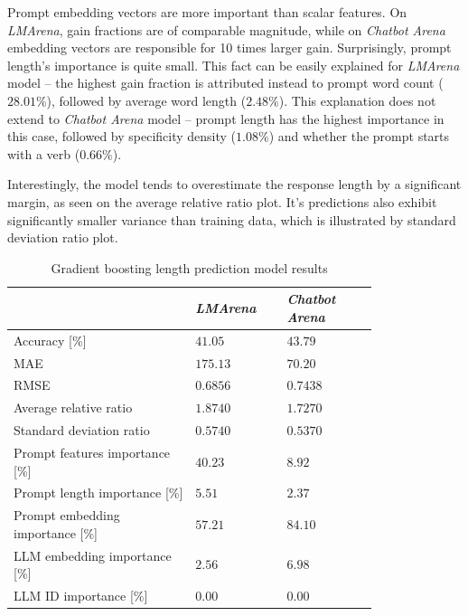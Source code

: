\documentclass[a4paper,11pt,twoside]{report}
\theoremstyle{definition}
\begin{document}
Prompt embedding vectors are more important than scalar features. On \textit{LMArena}, gain fractions are of comparable magnitude, while on \textit{Chatbot Arena} embedding vectors are responsible for 10 times larger gain. Surprisingly, prompt length's importance is quite small. This fact can be easily explained for \textit{LMArena} model -- the highest gain fraction is attributed instead to prompt word count ($28.01 \%$), followed by average word length ($2.48 \%$). This explanation does not extend to \textit{Chatbot Arena} model -- prompt length has the highest importance in this case, followed by specificity density ($1.08 \%$) and whether the prompt starts with a verb ($0.66 \%$). 

Interestingly, the model tends to overestimate the response length by a significant margin, as seen on the average relative ratio plot. It's predictions also exhibit significantly smaller variance than training data, which is illustrated by standard deviation ratio plot.

\begin{table}[h]
    \centering
    \caption{Gradient boosting length prediction model results}
    \begin{tabular}{
    >{\raggedright\arraybackslash}p{0.4\linewidth}
    >{\centering\arraybackslash}p{0.2\linewidth}
    >{\centering\arraybackslash}p{0.2\linewidth}
    }
        \toprule
        & \textit{LMArena} & \textit{Chatbot Arena} \\
        \midrule
        Accuracy [\%]                       & $41.05$  & $43.79$  \\
        MAE                                 & $175.13$ & $70.20$  \\
        RMSE                                & $0.6856$ & $0.7438$ \\
        Average relative ratio              & $1.8740$ & $1.7270$ \\
        Standard deviation ratio            & $0.5740$ & $0.5370$ \\
        Prompt features importance [\%]     & $40.23$  & $8.92$   \\
        \quad Prompt length importance [\%] & $5.51$   & $2.37$   \\
        Prompt embedding importance [\%]    & $57.21$  & $84.10$  \\
        LLM embedding importance [\%]       & $2.56$   & $6.98$   \\
        LLM ID importance [\%]              & $0.00$   & $0.00$   \\
        \bottomrule
    \end{tabular}
    \label{table:gb-length-prediction-results}
\end{table}
\end{document}
